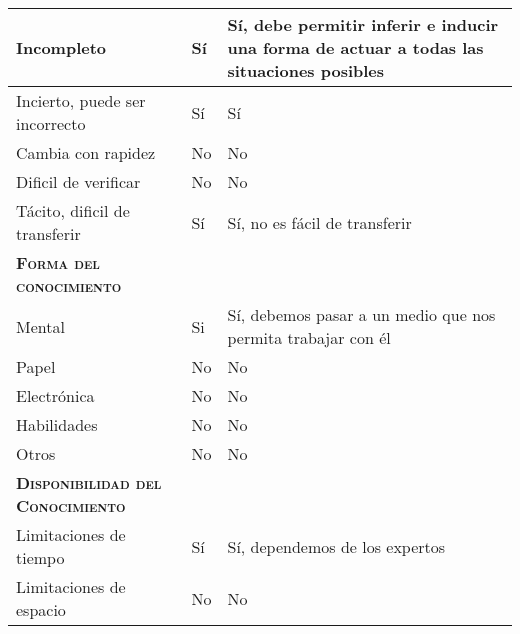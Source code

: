 \begin{table}[H]
{\begin{tabular}{|l|l|l|}
		Incompleto & \multicolumn{1}{p{1.0cm}|}{Sí} & \multicolumn{1}{p{13.0cm}|}{Sí, debe permitir inferir e inducir una forma de actuar a todas las situaciones posibles}\\
		\hline

		Incierto, puede ser incorrecto & \multicolumn{1}{p{1.0cm}|}{Sí} & \multicolumn{1}{p{13.0cm}|}{Sí}\\
		\hline

		Cambia con rapidez & \multicolumn{1}{p{1.0cm}|}{No} & \multicolumn{1}{p{13.0cm}|}{No}\\
		\hline

		Dificil de verificar & \multicolumn{1}{p{1.0cm}|}{No} & \multicolumn{1}{p{13.0cm}|}{No}\\
		\hline

		Tácito, dificil de transferir& \multicolumn{1}{p{1.0cm}|}{Sí} & \multicolumn{1}{p{13.0cm}|}{Sí, no es fácil de transferir}\\
		\hline

		\textsc {\textbf{Forma del conocimiento}}& \multicolumn{1}{p{1.0cm}|}{} & \multicolumn{1}{p{13.0cm}|}{}\\
		\hline

		Mental & \multicolumn{1}{p{1.0cm}|}{Si} & \multicolumn{1}{p{13.0cm}|}{Sí, debemos pasar a un medio que nos permita trabajar con él}\\
		\hline

		Papel & \multicolumn{1}{p{1.0cm}|}{No} & \multicolumn{1}{p{13.0cm}|}{No}\\
		\hline

		Electrónica & \multicolumn{1}{p{1.0cm}|}{No} & \multicolumn{1}{p{13.0cm}|}{No}\\
		\hline

		Habilidades & \multicolumn{1}{p{1.0cm}|}{No} & \multicolumn{1}{p{13.0cm}|}{No}\\
		\hline

		Otros & \multicolumn{1}{p{1.0cm}|}{No} & \multicolumn{1}{p{13.0cm}|}{No}\\
		\hline

		\textsc {\textbf{Disponibilidad del Conocimiento}} & \multicolumn{1}{p{1.0cm}|}{} & \multicolumn{1}{p{13.0cm}|}{}\\
		\hline
		Limitaciones de tiempo& \multicolumn{1}{p{1.0cm}|}{Sí} & \multicolumn{1}{p{13.0cm}|}{Sí, dependemos de los expertos}\\
		\hline

		Limitaciones de espacio& \multicolumn{1}{p{1.0cm}|}{No} & \multicolumn{1}{p{13.0cm}|}{No}\\
		\hline


\end{tabular}}
\end{table}
